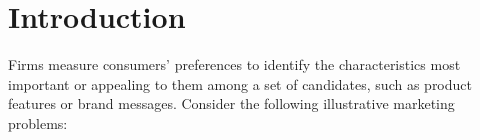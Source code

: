 \documentclass[blindrev]{informs3} %
\begin{document}
\newpage

\OneAndAHalfSpacedXI



%




\section{Introduction}

Firms measure consumers' preferences to identify the characteristics most important or appealing to them among a set of candidates, such as product features or brand messages. Consider the following illustrative marketing problems:
\end{document}
